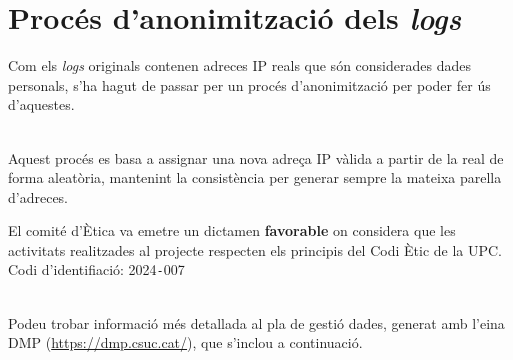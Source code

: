 \chapter{Procés d'anonimització dels \textit{\gls{log}s}}\label{ch:log-anonymization}

\noindent
Com els \textit{\gls{log}s} originals contenen adreces \gls{IP} reals que són considerades dades personals, s'ha hagut de passar per un procés d'anonimització per poder fer ús d'aquestes.

\noindent \\
Aquest procés es basa a assignar una nova adreça IP vàlida a partir de la real de forma aleatòria, mantenint la consistència per generar sempre la mateixa parella d'adreces. \\

\begin{tcolorbox}[colback=green!5!white, colframe=green!50!black, title=Comitè d'Ètica de la UPC]
    El comité d'Ètica va emetre un dictamen \textbf{favorable} on considera que les activitats realitzades al projecte respecten els principis del Codi Ètic de la UPC\@.
    \tcblower
    Codi d'identifiació: 2024\texttt{-}007
\end{tcolorbox}

\noindent \\
Podeu trobar informació més detallada al pla de gestió dades, generat amb l'eina DMP (\url{https://dmp.csuc.cat/}), que s'inclou a continuació.


